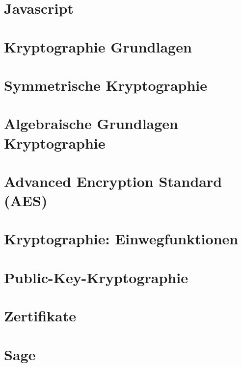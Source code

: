 \documentclass{scrreprt}
\begin{document}
\chapter{Javascript}


\chapter{Kryptographie Grundlagen}

\chapter{Symmetrische Kryptographie}

\chapter{Algebraische Grundlagen Kryptographie}

\chapter{Advanced Encryption Standard (AES)}

\chapter{Kryptographie: Einwegfunktionen}

\chapter{Public-Key-Kryptographie}

\chapter{Zertifikate}

\chapter{Sage}

\end{document}
